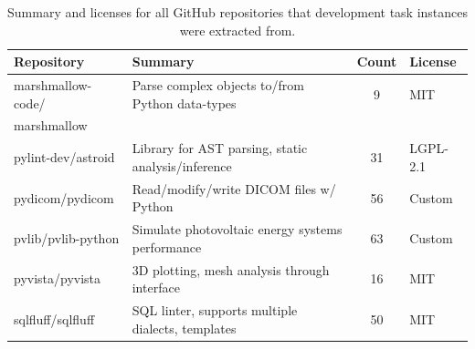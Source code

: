 \begin{table}[ht]
\centering
\begin{tabular}{l|lcl}
\toprule
    Repository & Summary & Count & License \\
\midrule
    marshmallow-code/  & Parse complex objects to/from Python data-types & 9 & MIT \\
    \quad marshmallow  & & & \\
    pylint-dev/astroid & Library for AST parsing, static analysis/inference & 31 & LGPL-2.1 \\
    pydicom/pydicom    & Read/modify/write DICOM files w/ Python & 56 & Custom \\
    pvlib/pvlib-python & Simulate photovoltaic energy systems performance & 63 & Custom \\
    pyvista/pyvista    & 3D plotting, mesh analysis through interface & 16 & MIT \\
    sqlfluff/sqlfluff  & SQL linter, supports multiple dialects, templates & 50 & MIT \\
\bottomrule
\end{tabular}
\caption{Summary and licenses for all GitHub repositories that development task instances were extracted from.}
\label{table:dev-repo-summaries}
\end{table}